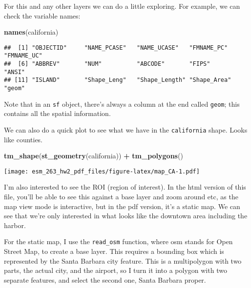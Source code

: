 \documentclass[
]{article}
\newenvironment{Shaded}{\begin{snugshade}}{\end{snugshade}}
\newcommand{\KeywordTok}[1]{\textcolor[rgb]{0.13,0.29,0.53}{\textbf{#1}}}
\newcommand{\NormalTok}[1]{#1}
\newcommand{\OperatorTok}[1]{\textcolor[rgb]{0.81,0.36,0.00}{\textbf{#1}}}
\newcommand{\StringTok}[1]{\textcolor[rgb]{0.31,0.60,0.02}{#1}}
\begin{document}
For this and any other layers we can do a little exploring. For example,
we can check the variable names:

\begin{Shaded}
\begin{Highlighting}[]
\KeywordTok{names}\NormalTok{(california)}
\end{Highlighting}
\end{Shaded}

\begin{verbatim}
##  [1] "OBJECTID"     "NAME_PCASE"   "NAME_UCASE"   "FMNAME_PC"    "FMNAME_UC"   
##  [6] "ABBREV"       "NUM"          "ABCODE"       "FIPS"         "ANSI"        
## [11] "ISLAND"       "Shape_Leng"   "Shape_Length" "Shape_Area"   "geom"
\end{verbatim}

Note that in an \texttt{sf} object, there's always a column at the end
called \texttt{geom}; this contains all the spatial information.

We can also do a quick plot to see what we have in the
\texttt{california} shape. Looks like counties.

\begin{Shaded}
\begin{Highlighting}[]
\KeywordTok{tm_shape}\NormalTok{(}\KeywordTok{st_geometry}\NormalTok{(california)) }\OperatorTok{+}
\StringTok{  }\KeywordTok{tm_polygons}\NormalTok{()}
\end{Highlighting}
\end{Shaded}

\texttt{[image: esm\_263\_hw2\_pdf\_files/figure-latex/map\_CA-1.pdf]}

I'm also interested to see the ROI (region of interest). In the html
version of this file, you'll be able to see this against a base layer
and zoom around etc, as the map view mode is interactive, but in the pdf
version, it's a static map. We can see that we're only interested in
what looks like the downtown area including the harbor.

For the static map, I use the \texttt{read\_osm} function, where osm
stands for Open Street Map, to create a base layer. This requires a
bounding box which is represented by the Santa Barbara city feature.
This is a multipolygon with two parts, the actual city, and the airport,
so I turn it into a polygon with two separate features, and select the
second one, Santa Barbara proper.
\end{document}
